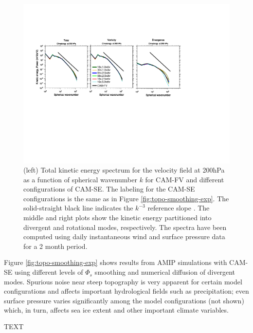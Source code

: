 \documentclass[gmd]{copernicus}
\begin{document}
\begin{figure}[t]
\vspace*{2mm}
\begin{center}
\includegraphics[width=12cm]{fig/TKE-fig}
\end{center}
  \caption{(left) Total kinetic energy spectrum for the velocity field at 200hPa as a function of spherical wavenumber $k$ for CAM-FV and different configurations of CAM-SE. The labeling for the CAM-SE configurations is the same as in Figure \ref{fig:topo-smoothing-exp}. The solid-straight black line indicates the $k^{-3}$ reference slope \citep{NG1985JAS}. The middle and right plots show the kinetic energy partitioned into divergent and rotational modes, respectively. The spectra have been computed using daily instantaneous wind and surface pressure data for a 2 month period.}\label{fig:tke}
\end{figure}




Figure \ref{fig:topo-smoothing-exp} shows results from AMIP simulations with CAM-SE using different levels of $\Phi_s$ smoothing and numerical diffusion of divergent modes. Spurious noise near steep topography is very apparent for certain model configurations and affects important hydrological fields such as precipitation; even surface pressure varies significantly among the model configurations (not shown) which, in turn, affects sea ice extent and other important climate variables. 

 







TEXT
\end{document}
